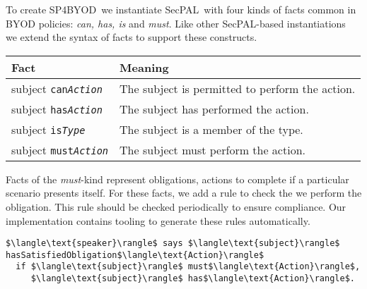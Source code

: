 \documentclass{llncs}
\newcommand{\AppPAL}[0]{SP4BYOD}
\begin{document}
To create \AppPAL~we instantiate SecPAL~with four kinds of facts common in BYOD policies: \emph{can, has, is} and \emph{must}.
Like other SecPAL-based instantiations~\cite{becker_framework_2009,aziz_secpal4dsa:_2011} we extend the syntax of facts to support these constructs.

\begin{center}
  \footnotesize\sffamily
  \newcommand{\predicate}[3]{#1 \texttt{#2\textit{#3}}}
  \begin{tabular}{l l}
    \toprule
    Fact                              & Meaning                                         \\
    \midrule
    \predicate{subject}{can}{Action}  & The subject is permitted to perform the action. \\
    \predicate{subject}{has}{Action}  & The subject has performed the action.           \\
    \predicate{subject}{is}{Type}     & The subject is a member of the type.            \\
    \predicate{subject}{must}{Action} & The subject must perform the action.            \\
    \bottomrule
  \end{tabular}
\end{center}

Facts of the \emph{must}-kind represent obligations, actions to complete if a particular scenario presents itself.
For these facts, we add a rule to check the we perform the obligation.
This rule should be checked periodically to ensure compliance.
Our implementation contains tooling to generate these rules automatically.
\begin{lstlisting}
$\langle\text{speaker}\rangle$ says $\langle\text{subject}\rangle$ hasSatisfiedObligation$\langle\text{Action}\rangle$
  if $\langle\text{subject}\rangle$ must$\langle\text{Action}\rangle$,
     $\langle\text{subject}\rangle$ has$\langle\text{Action}\rangle$.
\end{lstlisting}
\end{document}
